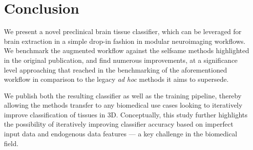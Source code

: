\documentclass[11pt, english]{article}
\begin{document}
    \section{Conclusion}
    We present a novel preclinical brain tissue classifier, which can be leveraged for brain extraction in a simple drop-in fashion in modular neuroimaging workflows.
    We benchmark the augmented workflow against the selfsame methods highlighted in the original publication, and find numerous improvements, at a significance level approaching that reached in the benchmarking of the aforementioned workflow in comparison to the legacy \textit{ad hoc} methods it aims to supersede.

    We publish both the resulting classifier as well as the training pipeline, thereby allowing the methods transfer to any biomedical use cases looking to iteratively improve classification of tissues in 3D.
    Conceptually, this study further highlights the possibility of iteratively improving classifier accuracy based on imperfect input data and endogenous data features --- a key challenge in the biomedical field.




    \clearpage
    \printbibliography
\end{document}

